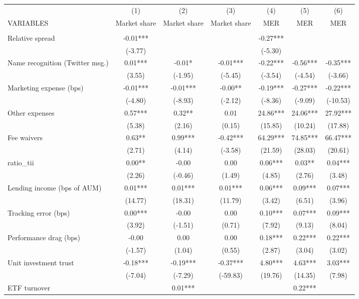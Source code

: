 \documentclass[]{article}
\begin{document}
\begin{tabular}{lcccccc} \hline
 & (1) & (2) & (3) & (4) & (5) & (6) \\
VARIABLES & Market share & Market share & Market share & MER & MER & MER \\ \hline
 &  &  &  &  &  &  \\
Relative spread & -0.01*** &  &  & -0.27*** &  &  \\
 & (-3.77) &  &  & (-5.30) &  &  \\
Name recognition (Twitter msg.) & 0.01*** & -0.01* & -0.01*** & -0.22*** & -0.56*** & -0.35*** \\
 & (3.55) & (-1.95) & (-5.45) & (-3.54) & (-4.54) & (-3.66) \\
Marketing expense (bps) & -0.01*** & -0.01*** & -0.00** & -0.19*** & -0.27*** & -0.22*** \\
 & (-4.80) & (-8.93) & (-2.12) & (-8.36) & (-9.09) & (-10.53) \\
Other expenses & 0.57*** & 0.32** & 0.01 & 24.86*** & 24.06*** & 27.92*** \\
 & (5.38) & (2.16) & (0.15) & (15.85) & (10.24) & (17.88) \\
Fee waivers & 0.63** & 0.99*** & -0.42*** & 64.29*** & 74.85*** & 66.47*** \\
 & (2.71) & (4.14) & (-3.58) & (21.59) & (28.03) & (20.61) \\
ratio\_tii & 0.00** & -0.00 & 0.00 & 0.06*** & 0.03** & 0.04*** \\
 & (2.26) & (-0.46) & (1.49) & (4.85) & (2.76) & (3.48) \\
Lending income (bps of AUM) & 0.01*** & 0.01*** & 0.01*** & 0.06*** & 0.09*** & 0.07*** \\
 & (14.77) & (18.31) & (11.79) & (3.42) & (6.51) & (3.96) \\
Tracking error (bps) & 0.00*** & -0.00 & 0.00 & 0.10*** & 0.07*** & 0.09*** \\
 & (3.92) & (-1.51) & (0.71) & (7.92) & (9.13) & (8.04) \\
Performance drag (bps) & -0.00 & 0.00 & 0.00 & 0.18*** & 0.22*** & 0.22*** \\
 & (-1.57) & (1.04) & (0.55) & (2.87) & (3.04) & (3.02) \\
Unit investment trust & -0.18*** & -0.19*** & -0.37*** & 4.80*** & 4.63*** & 3.03*** \\
 & (-7.04) & (-7.29) & (-59.83) & (19.76) & (14.35) & (7.98) \\
ETF turnover &  & 0.01*** &  &  & 0.22*** &  \\

\end{tabular}
\end{document}
